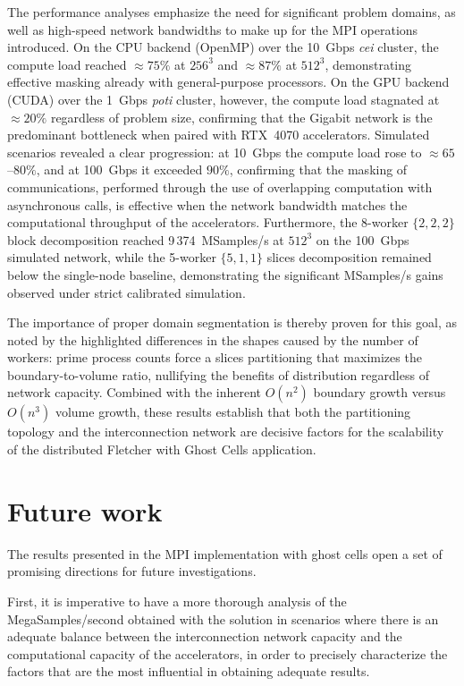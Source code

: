 \documentclass[cic,tc,english]{infufrgs}
\begin{document}
The performance analyses emphasize the need for significant problem
domains, as well as high-speed network bandwidths to make up for the
MPI operations introduced. On the CPU backend (OpenMP) over the
10~Gbps \textit{cei} cluster, the compute load reached $\approx
75\%$ at $256^3$ and $\approx 87\%$ at $512^3$, demonstrating
effective masking already with general-purpose processors. On the GPU
backend (CUDA) over the 1~Gbps \textit{poti} cluster, however, the
compute load stagnated at $\approx 20\%$ regardless of problem
size, confirming that the Gigabit network is the predominant
bottleneck when paired with RTX~4070 accelerators. Simulated
scenarios revealed a clear progression: at 10~Gbps the compute load
rose to $\approx 65$--$80\%$, and at 100~Gbps it exceeded $90\%$,
confirming that the masking of communications, performed through
the use of overlapping computation with asynchronous calls, is
effective when the network bandwidth matches the computational
throughput of the accelerators. Furthermore, the 8-worker
$\{2,2,2\}$ block decomposition reached 9\,374~MSamples/s at
$512^3$ on the 100~Gbps simulated network, while the 5-worker
$\{5,1,1\}$ slices decomposition remained below the single-node
baseline, demonstrating the significant MSamples/s gains observed
under strict calibrated simulation.

The importance of proper domain segmentation is thereby proven for
this goal, as noted by the highlighted differences in the shapes
caused by the number of workers: prime process counts force a slices
partitioning that maximizes the boundary-to-volume ratio, nullifying
the benefits of distribution regardless of network capacity.
Combined with the inherent $O(n^2)$ boundary growth versus $O(n^3)$
volume growth, these results establish that both the partitioning
topology and the interconnection network are decisive factors for
the scalability of the distributed Fletcher with Ghost Cells application.

\section{Future work}
The results presented in the MPI implementation with ghost cells open a
set of promising directions for future investigations.

First, it is imperative to have
a more thorough analysis of the MegaSamples/second obtained with the
solution in scenarios where there is an adequate balance between the
interconnection network capacity and the computational capacity of the
accelerators, in order to precisely characterize the factors that are the
most influential in obtaining adequate results.
\end{document}

